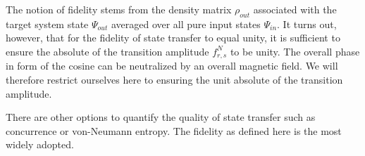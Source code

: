 \noindent The notion of fidelity stems from the density matrix $\rho_{out}$ associated with the target system state $\Psi_{out}$ averaged over all pure input states $\Psi_{in}$\cite{Bose2003}. It turns out, however, that for the fidelity of state transfer to equal unity, it is sufficient to ensure the absolute of the transition amplitude $f^N_{r,s}$ to be unity. The overall phase in form of the cosine can be neutralized by an overall magnetic field. We will therefore restrict ourselves here to ensuring the unit absolute of the transition amplitude.\par
There are other options to quantify the quality of state transfer such as concurrence or von-Neumann entropy. The fidelity as defined here is the most widely adopted.


\begin{center}
\end{center}

